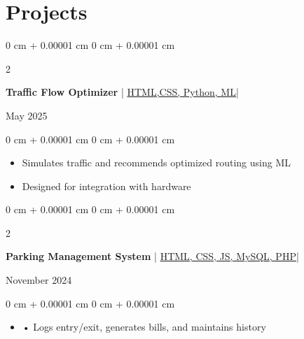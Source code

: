 \documentclass[10pt, letterpaper]{article}
\newenvironment{onecolentry}{
    \begin{adjustwidth}{
        0 cm + 0.00001 cm
    }{
        0 cm + 0.00001 cm
    }
}{
    \end{adjustwidth}
} %
\newenvironment{twocolentry}[2][]{
    \onecolentry
    \def\secondColumn{#2}
    \setcolumnwidth{\fill, 4.5 cm}
    \begin{paracol}{2}
}{
    \switchcolumn \raggedleft \secondColumn
    \end{paracol}
    \endonecolentry
} %
\begin{document}
        
    

        
    
    \section{Projects}

        \vspace{0.1 cm}
        \begin{twocolentry}{May 2025}
        \hspace{0.4 em}\textbf{Traffic Flow Optimizer} | \href{https://github.com/neerajbabudevagiri/Traffic-Flow-Optimizer} {HTML,CSS, Python, ML| 
  {\faGithub}}
    \end{twocolentry}
    \vspace{0.10 cm}
    \begin{onecolentry}
        \begin{itemize}[leftmargin=2 em]
            \item Simulates traffic and recommends optimized routing using ML
            \item Designed for integration with hardware
        \end{itemize}
    \end{onecolentry}

    \vspace{0.1 cm}
    \begin{twocolentry}{November 2024}
        \hspace{0.4 em}\textbf{Parking Management System } | \href{https://github.com/neerajbabudevagiri/Parking-management-system} {HTML, CSS, JS, MySQL, PHP| 
  {\faGithub}}
    \end{twocolentry}
    \vspace{0.10 cm}
    \begin{onecolentry}
        \begin{itemize}[leftmargin=2 em]
            \item • Logs entry/exit, generates bills, and maintains history
        \end{itemize}
    \end{onecolentry}

    \vspace{0.1 cm}
\end{document}

